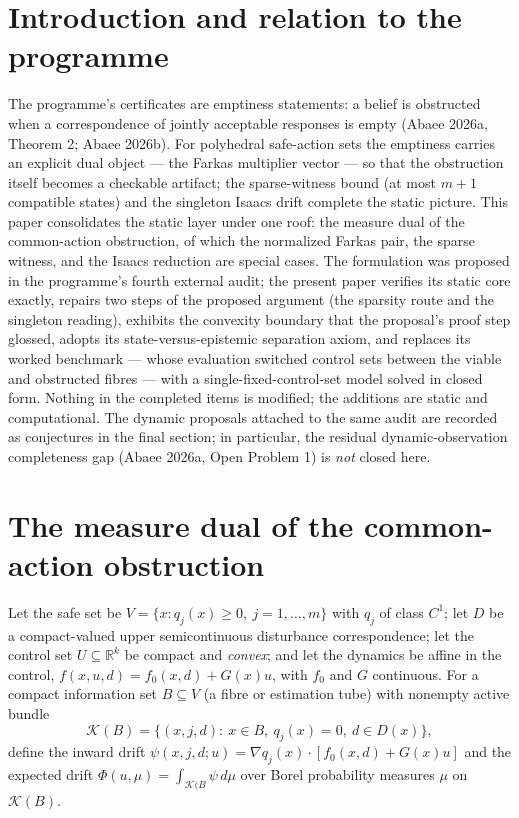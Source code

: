 \documentclass[10pt,twocolumn]{article}
\theoremstyle{definition}
\begin{document}
\section{Introduction and relation to the programme}

The programme's certificates are emptiness statements: a belief is
obstructed when a correspondence of jointly acceptable responses is empty
(Abaee 2026a, Theorem 2; Abaee 2026b). For polyhedral safe-action sets the
emptiness carries an explicit dual object --- the Farkas multiplier vector
--- so that the obstruction itself becomes a checkable artifact; the
sparse-witness bound (at most $m+1$ compatible states) and the singleton
Isaacs drift complete the static picture. This paper consolidates the
static layer under one roof: the measure dual of the common-action
obstruction, of which the normalized Farkas pair, the sparse witness, and
the Isaacs reduction are special cases. The formulation was proposed in
the programme's fourth external audit; the present paper verifies its
static core exactly, repairs two steps of the proposed argument (the
sparsity route and the singleton reading), exhibits the convexity boundary
that the proposal's proof step glossed, adopts its state-versus-epistemic
separation axiom, and replaces its worked benchmark --- whose evaluation
switched control sets between the viable and obstructed fibres --- with a
single-fixed-control-set model solved in closed form. Nothing in the
completed items is modified; the additions are static and computational.
The dynamic proposals attached to the same audit are recorded as
conjectures in the final section; in particular, the residual
dynamic-observation completeness gap (Abaee 2026a, Open Problem 1) is
\emph{not} closed here.

\section{The measure dual of the common-action obstruction}

Let the safe set be $V = \{x: q_{j}(x) \ge 0,\ j = 1,\dots,m\}$ with
$q_{j}$ of class $C^{1}$; let $D$ be a compact-valued upper
semicontinuous disturbance correspondence; let the control set
$U \subseteq \mathbb{R}^{k}$ be compact and \emph{convex}; and let the
dynamics be affine in the control,
$f(x,u,d) = f_{0}(x,d) + G(x)u$, with $f_{0}$ and $G$ continuous. For a
compact information set $B \subseteq V$ (a fibre or estimation tube) with
nonempty active bundle
\[
\mathcal{K}(B) = \{(x,j,d):\ x \in B,\ q_{j}(x) = 0,\ d \in D(x)\},
\]
define the inward drift
$\psi(x,j,d;u) = \nabla q_{j}(x)\cdot[f_{0}(x,d) + G(x)u]$ and the
expected drift $\Phi(u,\mu) = \int_{\mathcal{K}(B} \psi \,d\mu$ over
Borel probability measures $\mu$ on $\mathcal{K}(B)$.
\end{document}
